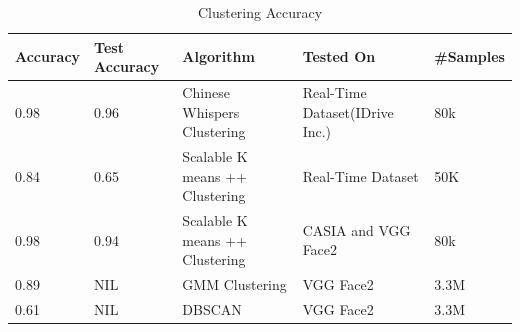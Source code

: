\documentclass[a4paper,12pt, twoside]{NITKReport}
\begin{document}
\begin{table}[h]
  \centering
\begin{tabular}{ |p{1.5cm}|p{1.5cm}|p{3.5cm}|p{4cm}|p{2cm}|}
\hline
Accuracy & Test Accuracy & Algorithm & Tested On & \#Samples\\
\hline
0.98 & 0.96 & Chinese Whispers Clustering & Real-Time Dataset(IDrive Inc.) & 80k \\
\hline
0.84 & 0.65 & Scalable K means ++ Clustering & Real-Time Dataset & 50K \\
\hline
0.98 & 0.94 & Scalable K means ++ Clustering & CASIA and VGG Face2 & 80k \\
\hline
0.89 & NIL & GMM Clustering & VGG Face2 & 3.3M \\
\hline
0.61 & NIL & DBSCAN & VGG Face2 & 3.3M \\
\hline
\end{tabular}
\caption{Clustering Accuracy}\label{table:cluster}
\end{table}
\end{document}
